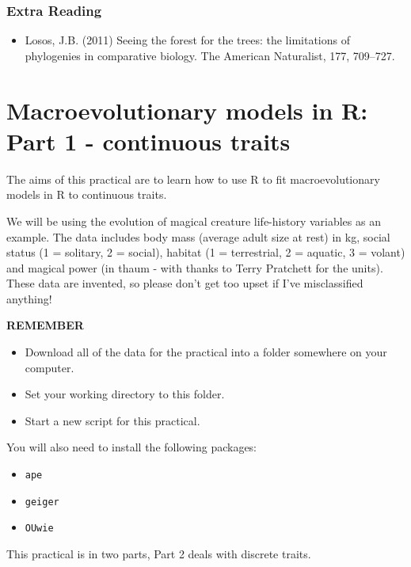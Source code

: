 \documentclass[]{book}
\providecommand{\tightlist}{%
  \setlength{\itemsep}{0pt}\setlength{\parskip}{0pt}}
\begin{document}
\subsection{Extra Reading}\label{extra-reading-1}

\begin{itemize}
\tightlist
\item
  Losos, J.B. (2011) Seeing the forest for the trees: the limitations of
  phylogenies in comparative biology. The American Naturalist, 177,
  709--727.
\end{itemize}

\chapter{Macroevolutionary models in R: Part 1 - continuous
traits}\label{macroevolutionary-models-in-r-part-1---continuous-traits}

The aims of this practical are to learn how to use R to fit
macroevolutionary models in R to continuous traits.

We will be using the evolution of magical creature life-history
variables as an example. The data includes body mass (average adult size
at rest) in kg, social status (1 = solitary, 2 = social), habitat (1 =
terrestrial, 2 = aquatic, 3 = volant) and magical power (in thaum - with
thanks to Terry Pratchett for the units). These data are invented, so
please don't get too upset if I've misclassified anything!

\textbf{REMEMBER}

\begin{itemize}
\tightlist
\item
  Download all of the data for the practical into a folder somewhere on
  your computer.
\item
  Set your working directory to this folder.
\item
  Start a new script for this practical.
\end{itemize}

You will also need to install the following packages:

\begin{itemize}
\tightlist
\item
  \texttt{ape}
\item
  \texttt{geiger}
\item
  \texttt{OUwie}
\end{itemize}

This practical is in two parts, Part 2 deals with discrete traits.
\end{document}
